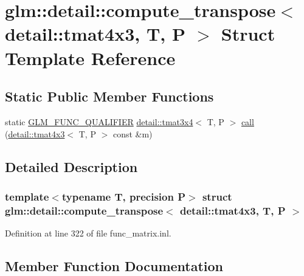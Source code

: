 \hypertarget{structglm_1_1detail_1_1compute__transpose_3_01detail_1_1tmat4x3_00_01_t_00_01_p_01_4}{}\section{glm\+:\+:detail\+:\+:compute\+\_\+transpose$<$ detail\+:\+:tmat4x3, T, P $>$ Struct Template Reference}
\label{structglm_1_1detail_1_1compute__transpose_3_01detail_1_1tmat4x3_00_01_t_00_01_p_01_4}
\subsection*{Static Public Member Functions}
\begin{DoxyCompactItemize}
\item 
static \hyperlink{setup_8hpp_a33fdea6f91c5f834105f7415e2a64407}{G\+L\+M\+\_\+\+F\+U\+N\+C\+\_\+\+Q\+U\+A\+L\+I\+F\+I\+ER} \hyperlink{structglm_1_1detail_1_1tmat3x4}{detail\+::tmat3x4}$<$ T, P $>$ \hyperlink{structglm_1_1detail_1_1compute__transpose_3_01detail_1_1tmat4x3_00_01_t_00_01_p_01_4_aba1245556b2c86727dfb37d64f6a9b9a}{call} (\hyperlink{structglm_1_1detail_1_1tmat4x3}{detail\+::tmat4x3}$<$ T, P $>$ const \&m)
\end{DoxyCompactItemize}


\subsection{Detailed Description}
\subsubsection*{template$<$typename T, precision P$>$\newline
struct glm\+::detail\+::compute\+\_\+transpose$<$ detail\+::tmat4x3, T, P $>$}



Definition at line 322 of file func\+\_\+matrix.\+inl.



\subsection{Member Function Documentation}
\mbox{\label{structglm_1_1detail_1_1compute__transpose_3_01detail_1_1tmat4x3_00_01_t_00_01_p_01_4_aba1245556b2c86727dfb37d64f6a9b9a}} 
